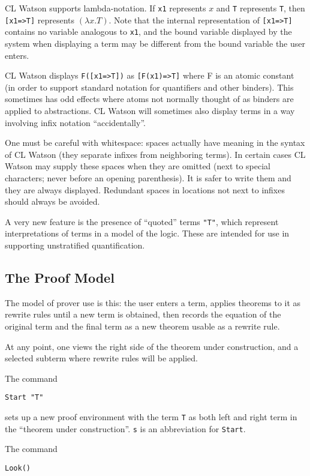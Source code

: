 \documentclass[12pt]{article}
\begin{document}
CL Watson supports lambda-notation.  If {\tt x1} represents $x$ and
{\tt T} represents {\tt T}, then {\tt [x1=>T]} represents $(\lambda x.T)$.
Note that the internal representation of {\tt [x1=>T]} contains no variable
analogous to {\tt x1}, and the bound variable displayed by the system when
displaying a term may be different from the bound variable the user enters.

CL Watson displays {\tt F([x1=>T])} as {\tt [F(x1)=>T]} where F is an atomic
constant (in order to support standard notation for quantifiers and
other binders).  This sometimes has odd effects where atoms not
normally thought of as binders are applied to abstractions.  CL Watson
will sometimes also display terms in a way involving infix notation
``accidentally''.

One must be careful with whitespace: spaces actually have meaning in
the syntax of CL Watson (they separate infixes from neighboring
terms).  In certain cases CL Watson may supply these spaces when they
are omitted (next to special characters; never before an opening
parenthesis).  It is safer to write them and they are always
displayed.  Redundant spaces in locations not next to infixes should
always be avoided.

A very new feature is the presence of ``quoted'' terms {\tt "T"},
which represent interpretations of terms in a model of the logic.
These are intended for use in supporting unstratified quantification.

\subsection{The Proof Model}

The model of prover use is this: the user enters a term, applies
theorems to it as rewrite rules until a new term is obtained, then
records the equation of the original term and the final term as a new
theorem usable as a rewrite rule.

At any point, one views the right side of the theorem under construction,
and a selected subterm where rewrite rules will be applied.

The command

{\tt Start "T"}

sets up a new proof environment with the term {\tt T} as both left and
right term in the ``theorem under construction''.  {\tt s} is an
abbreviation for {\tt Start}.

The command 

{\tt Look()}
\end{document}
